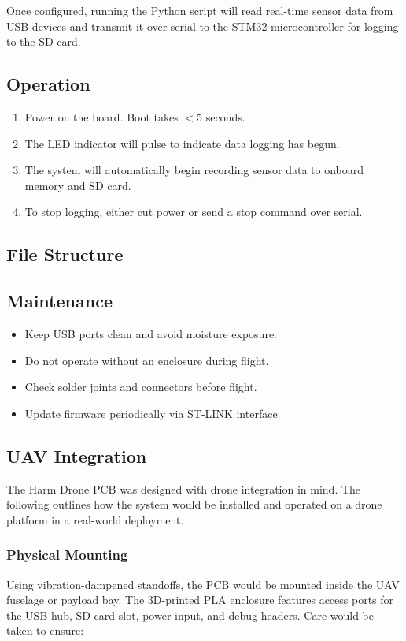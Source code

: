 \documentclass[../main.tex]{subfiles}
\begin{document}
Once configured, running the Python script will read real-time sensor data from USB devices and transmit it over serial to the STM32 microcontroller for logging to the SD card.


\subsection{Operation}
\begin{enumerate}
    \item Power on the board. Boot takes $<$5 seconds.
    \item The LED indicator will pulse to indicate data logging has begun.
    \item The system will automatically begin recording sensor data to onboard memory and SD card.
    \item To stop logging, either cut power or send a stop command over serial.
\end{enumerate}

\subsection{File Structure}

\subsection{Maintenance}
\begin{itemize}
    \item Keep USB ports clean and avoid moisture exposure.
    \item Do not operate without an enclosure during flight.
    \item Check solder joints and connectors before flight.
    \item Update firmware periodically via ST-LINK interface.
\end{itemize}
\subsection{UAV Integration}

The Harm Drone PCB was designed with drone integration in mind. The following outlines how the system would be installed and operated on a drone platform in a real-world deployment.

\subsubsection{Physical Mounting}
Using vibration-dampened standoffs, the PCB would be mounted inside the UAV fuselage or payload bay. The 3D-printed PLA enclosure features access ports for the USB hub, SD card slot, power input, and debug headers. Care would be taken to ensure:
\end{document}
